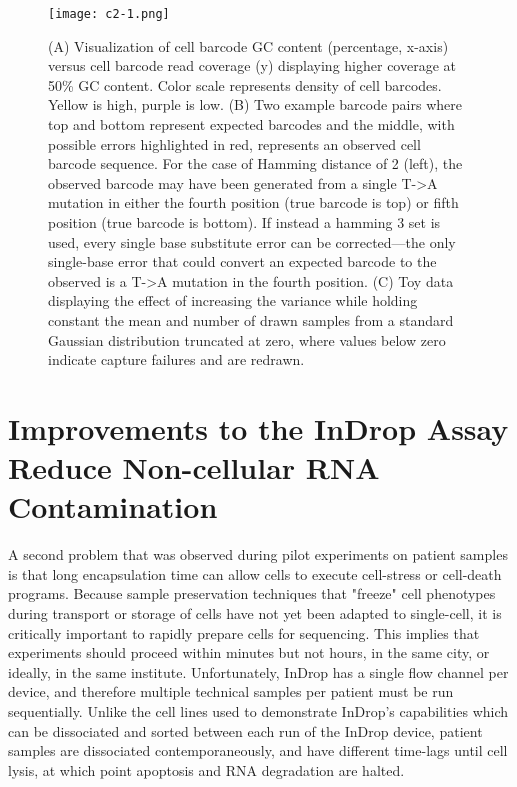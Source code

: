 \begin{figure} 
\centering
\texttt{[image: c2-1.png]} 
\caption{(A) Visualization of cell barcode GC content (percentage, x-axis) versus cell barcode read coverage (y) displaying higher coverage at 50\% GC content. 
  Color scale represents density of cell barcodes. Yellow is high, purple is low.  
(B) Two example barcode pairs where top and bottom represent expected barcodes and the middle, with possible errors highlighted in red, represents an observed cell barcode sequence. For the case of Hamming distance of 2 (left), the observed barcode may have been generated from a single T->A mutation in either the fourth position (true barcode is top) or fifth position (true barcode is bottom). If instead a hamming 3 set is used, every single base substitute error can be corrected---the only single-base error that could convert an expected barcode to the observed is a T->A mutation in the fourth position. (C) Toy data displaying the effect of increasing the variance while holding constant the mean and number of drawn samples from a standard Gaussian distribution truncated at zero, where values below zero indicate capture failures and are redrawn.}
\label{fig:c2-1}
\end{figure}

\section{Improvements to the InDrop Assay Reduce Non-cellular RNA Contamination}

A second problem that was observed during pilot experiments on patient samples is that long encapsulation time can allow cells to execute cell-stress or cell-death programs.
Because sample preservation techniques that "freeze" cell phenotypes during transport or storage of cells have not yet been adapted to single-cell, it is critically important to rapidly prepare cells for sequencing. 
This implies that experiments should proceed within minutes but not hours, in the same city, or ideally, in the same institute. 
Unfortunately, InDrop has a single flow channel per device, and therefore multiple technical samples per patient must be run sequentially. 
Unlike the cell lines used to demonstrate InDrop's capabilities which can be dissociated and sorted between each run of the InDrop device, patient samples are dissociated contemporaneously, and have different time-lags until cell lysis, at which point apoptosis and RNA degradation are halted.

